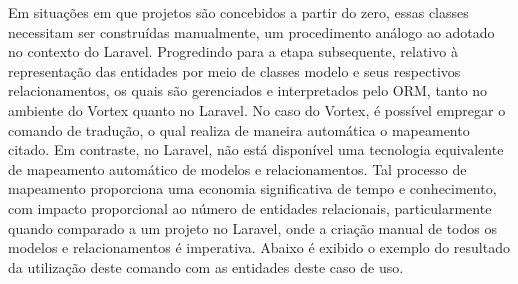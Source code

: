 \spaceH{}

\label{scripts/db_reverse_example_result.php}

Em situações em que projetos são concebidos a partir do zero, essas classes necessitam ser construídas manualmente, um procedimento análogo ao adotado no contexto do Laravel. Progredindo para a etapa subsequente, relativo à representação das entidades por meio de classes modelo e seus respectivos relacionamentos, os quais são gerenciados e interpretados pelo ORM, tanto no ambiente do Vortex quanto no Laravel. No caso do Vortex, é possível empregar o comando de tradução, o qual realiza de maneira automática o mapeamento citado. Em contraste, no Laravel, não está disponível uma tecnologia equivalente de mapeamento automático de modelos e relacionamentos. Tal processo de mapeamento proporciona uma economia significativa de tempo e conhecimento, com impacto proporcional ao número de entidades relacionais, particularmente quando comparado a um projeto no Laravel, onde a criação manual de todos os modelos e relacionamentos é imperativa. Abaixo é exibido o exemplo do resultado da utilização deste comando com as entidades deste caso de uso.

\spaceH{}

\label{scripts/db_translate_result_example.php}




